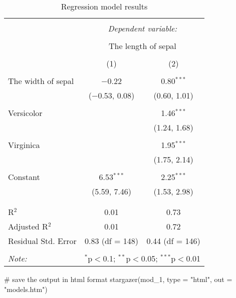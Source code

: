 \documentclass[
  letterpaper,
  DIV=11,
  numbers=noendperiod]{scrartcl}
\newenvironment{Shaded}{\begin{snugshade}}{\end{snugshade}}
\newcommand{\AttributeTok}[1]{\textcolor[rgb]{0.40,0.45,0.13}{#1}}
\newcommand{\CommentTok}[1]{\textcolor[rgb]{0.37,0.37,0.37}{#1}}
\newcommand{\FunctionTok}[1]{\textcolor[rgb]{0.28,0.35,0.67}{#1}}
\newcommand{\NormalTok}[1]{\textcolor[rgb]{0.00,0.23,0.31}{#1}}
\newcommand{\StringTok}[1]{\textcolor[rgb]{0.13,0.47,0.30}{#1}}
\begin{document}
\begin{table}[!htbp] \centering 
  \caption{Regression model results} 
  \label{} 
\begin{tabular}{@{\extracolsep{5pt}}lcc} 
\\[-1.8ex]\hline 
\hline \\[-1.8ex] 
 & \multicolumn{2}{c}{\textit{Dependent variable:}} \\ 
\cline{2-3} 
\\[-1.8ex] & \multicolumn{2}{c}{The length of sepal} \\ 
\\[-1.8ex] & (1) & (2)\\ 
\hline \\[-1.8ex] 
 The width of sepal & $-$0.22 & 0.80$^{***}$ \\ 
  & ($-$0.53, 0.08) & (0.60, 1.01) \\ 
  & & \\ 
 Versicolor &  & 1.46$^{***}$ \\ 
  &  & (1.24, 1.68) \\ 
  & & \\ 
 Virginica &  & 1.95$^{***}$ \\ 
  &  & (1.75, 2.14) \\ 
  & & \\ 
 Constant & 6.53$^{***}$ & 2.25$^{***}$ \\ 
  & (5.59, 7.46) & (1.53, 2.98) \\ 
  & & \\ 
\hline \\[-1.8ex] 
R$^{2}$ & 0.01 & 0.73 \\ 
Adjusted R$^{2}$ & 0.01 & 0.72 \\ 
Residual Std. Error & 0.83 (df = 148) & 0.44 (df = 146) \\ 
\hline 
\hline \\[-1.8ex] 
\textit{Note:}  & \multicolumn{2}{r}{$^{*}$p$<$0.1; $^{**}$p$<$0.05; $^{***}$p$<$0.01} \\ 
\end{tabular} 
\end{table}

\begin{Shaded}
\begin{Highlighting}[]
\CommentTok{\# save the output in html format}
\FunctionTok{stargazer}\NormalTok{(mod\_1, }\AttributeTok{type =} \StringTok{"html"}\NormalTok{, }\AttributeTok{out =} \StringTok{"models.htm"}\NormalTok{)}
\end{Highlighting}
\end{Shaded}
\end{document}
